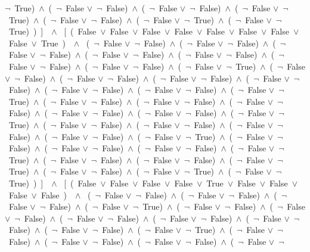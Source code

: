 ﻿\documentclass[a4paper,10pt]{article}
\begin{document}
$\neg$\ True)\ $\wedge$\ (\  $\neg$\ False $\vee$\  $\neg$\ False)\ $\wedge$\ (\  $\neg$\ False $\vee$\  $\neg$\ False)\ $\wedge$\ (\  $\neg$\ False $\vee$\  $\neg$\ True)\ $\wedge$\ (\  $\neg$\ False $\vee$\  $\neg$\ False)\ $\wedge$\ (\  $\neg$\ False $\vee$\  $\neg$\ True)\ $\wedge$\ (\  $\neg$\ False $\vee$\  $\neg$\ True)\ )\ ]\ \ $\wedge$ \ [\ (\ False\ $\vee$\ False\ $\vee$\ False\ $\vee$\ False\ $\vee$\ False\ $\vee$\ False\ $\vee$\ False\ $\vee$\ False\ $\vee$\ True\ )\ \ $\wedge$ \ (\  $\neg$\ False $\vee$\  $\neg$\ False)\ $\wedge$\ (\  $\neg$\ False $\vee$\  $\neg$\ False)\ $\wedge$\ (\  $\neg$\ False $\vee$\  $\neg$\ False)\ $\wedge$\ (\  $\neg$\ False $\vee$\  $\neg$\ False)\ $\wedge$\ (\  $\neg$\ False $\vee$\  $\neg$\ False)\ $\wedge$\ (\  $\neg$\ False $\vee$\  $\neg$\ False)\ $\wedge$\ (\  $\neg$\ False $\vee$\  $\neg$\ False)\ $\wedge$\ (\  $\neg$\ False $\vee$\  $\neg$\ True)\ $\wedge$\ (\  $\neg$\ False $\vee$\  $\neg$\ False)\ $\wedge$\ (\  $\neg$\ False $\vee$\  $\neg$\ False)\ $\wedge$\ (\  $\neg$\ False $\vee$\  $\neg$\ False)\ $\wedge$\ (\  $\neg$\ False $\vee$\  $\neg$\ False)\ $\wedge$\ (\  $\neg$\ False $\vee$\  $\neg$\ False)\ $\wedge$\ (\  $\neg$\ False $\vee$\  $\neg$\ False)\ $\wedge$\ (\  $\neg$\ False $\vee$\  $\neg$\ True)\ $\wedge$\ (\  $\neg$\ False $\vee$\  $\neg$\ False)\ $\wedge$\ (\  $\neg$\ False $\vee$\  $\neg$\ False)\ $\wedge$\ (\  $\neg$\ False $\vee$\  $\neg$\ False)\ $\wedge$\ (\  $\neg$\ False $\vee$\  $\neg$\ False)\ $\wedge$\ (\  $\neg$\ False $\vee$\  $\neg$\ False)\ $\wedge$\ (\  $\neg$\ False $\vee$\  $\neg$\ True)\ $\wedge$\ (\  $\neg$\ False $\vee$\  $\neg$\ False)\ $\wedge$\ (\  $\neg$\ False $\vee$\  $\neg$\ False)\ $\wedge$\ (\  $\neg$\ False $\vee$\  $\neg$\ False)\ $\wedge$\ (\  $\neg$\ False $\vee$\  $\neg$\ False)\ $\wedge$\ (\  $\neg$\ False $\vee$\  $\neg$\ True)\ $\wedge$\ (\  $\neg$\ False $\vee$\  $\neg$\ False)\ $\wedge$\ (\  $\neg$\ False $\vee$\  $\neg$\ False)\ $\wedge$\ (\  $\neg$\ False $\vee$\  $\neg$\ False)\ $\wedge$\ (\  $\neg$\ False $\vee$\  $\neg$\ True)\ $\wedge$\ (\  $\neg$\ False $\vee$\  $\neg$\ False)\ $\wedge$\ (\  $\neg$\ False $\vee$\  $\neg$\ False)\ $\wedge$\ (\  $\neg$\ False $\vee$\  $\neg$\ True)\ $\wedge$\ (\  $\neg$\ False $\vee$\  $\neg$\ False)\ $\wedge$\ (\  $\neg$\ False $\vee$\  $\neg$\ True)\ $\wedge$\ (\  $\neg$\ False $\vee$\  $\neg$\ True)\ )\ ]\ \ $\wedge$ \ [\ (\ False\ $\vee$\ False\ $\vee$\ False\ $\vee$\ False\ $\vee$\ True\ $\vee$\ False\ $\vee$\ False\ $\vee$\ False\ $\vee$\ False\ )\ \ $\wedge$ \ (\  $\neg$\ False $\vee$\  $\neg$\ False)\ $\wedge$\ (\  $\neg$\ False $\vee$\  $\neg$\ False)\ $\wedge$\ (\  $\neg$\ False $\vee$\  $\neg$\ False)\ $\wedge$\ (\  $\neg$\ False $\vee$\  $\neg$\ True)\ $\wedge$\ (\  $\neg$\ False $\vee$\  $\neg$\ False)\ $\wedge$\ (\  $\neg$\ False $\vee$\  $\neg$\ False)\ $\wedge$\ (\  $\neg$\ False $\vee$\  $\neg$\ False)\ $\wedge$\ (\  $\neg$\ False $\vee$\  $\neg$\ False)\ $\wedge$\ (\  $\neg$\ False $\vee$\  $\neg$\ False)\ $\wedge$\ (\  $\neg$\ False $\vee$\  $\neg$\ False)\ $\wedge$\ (\  $\neg$\ False $\vee$\  $\neg$\ True)\ $\wedge$\ (\  $\neg$\ False $\vee$\  $\neg$\ False)\ $\wedge$\ (\  $\neg$\ False $\vee$\  $\neg$\ False)\ $\wedge$\ (\  $\neg$\ False $\vee$\  $\neg$\ False)\ $\wedge$\ (\  $\neg$\ False $\vee$\  $\neg$\ 
\end{document}
